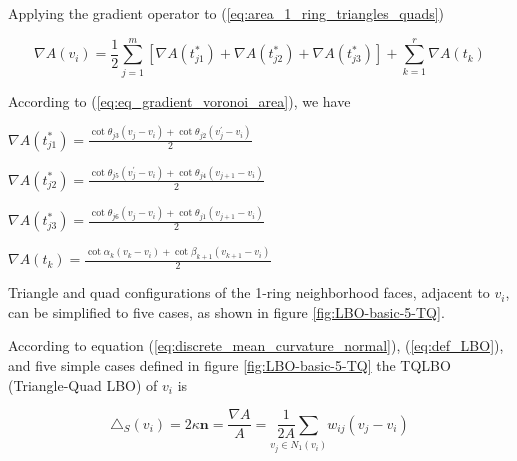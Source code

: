 \documentclass[10pt, conference]{IEEEtran}
\begin{document}
Applying the gradient operator to (\ref{eq:area_1_ring_triangles_quads})

{\small 
\begin{equation}
\nabla A\left(v_{i}\right)=\frac{1}{2}\overset{m}{\underset{j=1}{\sum}}\left[\nabla A\left(t_{j1}^{*}\right)+\nabla A\left(t_{j2}^{*}\right)+\nabla A\left(t_{j3}^{*}\right)\right]+\overset{r}{\underset{k=1}{\sum}}\nabla A\left(t_{k}\right)\label{eq:EqGrad}
\end{equation}
}{\small \par}

According to (\ref{eq:eq_gradient_voronoi_area}), we have

\begin{center}
$\nabla A\left(t_{j1}^{*}\right)=\frac{\cot\theta_{j3}\left(v_{j}-v_{i}\right)+\cot\theta_{j2}\left(v_{j}^{\prime}-v_{i}\right)}{2}$
\par\end{center}

\begin{center}
$\nabla A\left(t_{j2}^{*}\right)=\frac{\cot\theta_{j5}\left(v_{j}^{\prime}-v_{i}\right)+\cot\theta_{j4}\left(v_{j+1}-v_{i}\right)}{2}$
\par\end{center}

\begin{center}
$\nabla A\left(t_{j3}^{*}\right)=\frac{\cot\theta_{j6}\left(v_{j}-v_{i}\right)+\cot\theta_{j1}\left(v_{j+1}-v_{i}\right)}{2}$
\par\end{center}

\begin{center}
$\nabla A\left(t_{k}\right)=\frac{\cot\alpha_{k}\left(v_{k}-v_{i}\right)+\cot\beta_{k+1}\left(v_{k+1}-v_{i}\right)}{2}$
\par\end{center}

Triangle and quad configurations of the 1-ring neighborhood faces,
adjacent to $v_{i}$, can be simplified to five cases, as shown in
figure \ref{fig:LBO-basic-5-TQ}.

According to equation (\ref{eq:discrete_mean_curvature_normal}),
(\ref{eq:def_LBO}), and five simple cases defined in figure \ref{fig:LBO-basic-5-TQ}
the TQLBO (Triangle-Quad LBO) of $v_{i}$ is

\begin{equation}
\triangle_{S}\left(v_{i}\right)=2\kappa\mathbf{n}=\frac{\nabla A}{A}=\underset{v_{j}\in N_{1}\left(v_{i}\right)}{\frac{1}{2A}\sum}w_{ij}\left(v_{j}-v_{i}\right)
\end{equation}
\end{document}
